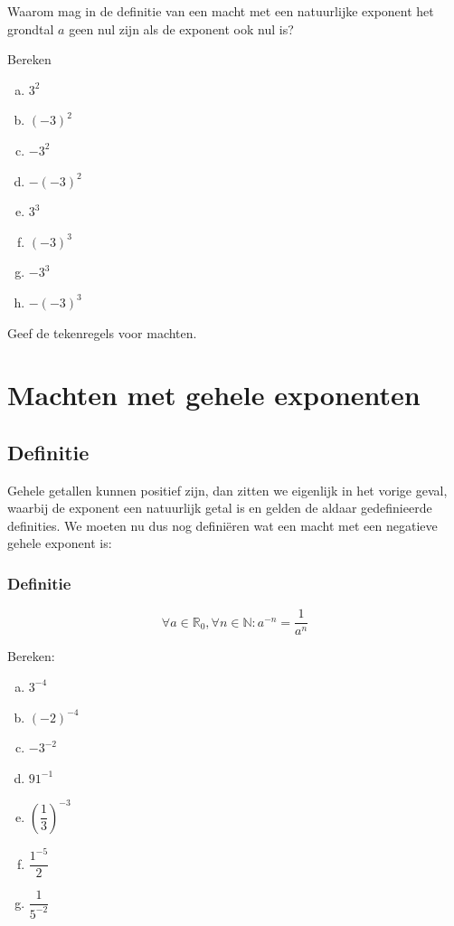 \documentclass[12pt,twoside,a4paper]{article}
\begin{document}
\begin{oefening}
Waarom mag in de definitie van een macht met een natuurlijke exponent het grondtal $a$ geen nul zijn als de exponent ook nul is?
\end{oefening}

\begin{oefening}
Bereken
\begin{multicols}{2}
\begin{enumerate}[(a)]
  \itemsep1em
  \item $3^2$
  \item $(-3)^2$
  \item $-3^2$
  \item $-(-3)^2$
  \item $3^3$
  \item $(-3)^3$
  \item $-3^3$
  \item $-(-3)^3$
\end{enumerate}
\end{multicols}
\end{oefening}

\begin{oefening}
Geef de tekenregels voor machten.
\end{oefening}

\cleardoublepage
\section{Machten met gehele exponenten}

\subsection{Definitie}

Gehele getallen kunnen positief zijn, dan zitten we eigenlijk in het vorige geval, waarbij de exponent een natuurlijk getal is en gelden de aldaar gedefinieerde definities. We moeten nu dus nog definiëren wat een macht met een negatieve gehele exponent is:
\subsubsection*{Definitie}
\begin{mdframed}
$$\forall a \in \mathbb{R}_0, \forall n\in \mathbb{N}: a^{-n} =\dfrac{1}{a^n}$$
\end{mdframed}

\begin{oefening}
Bereken:
\begin{multicols}{3}
\begin{enumerate}[(a)]
  \itemsep1em
  \item $3^{-4}$
  \item $(-2)^{-4}$
  \item $-3^{-2}$
  \item $91^{-1}$
  \item $\left(\dfrac{1}{3}\right)^{-3}$
  \item $\dfrac{1^{-5}}{2}$
  \item $\dfrac{1}{5^{-2}}$
\end{enumerate}
\end{multicols}
\end{oefening}
\end{document}
